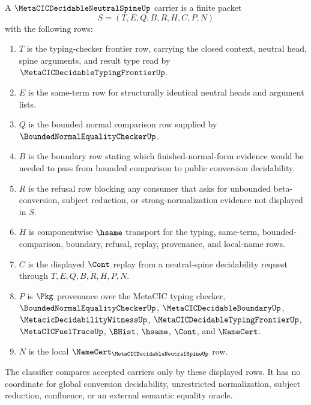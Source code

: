 \begin{definition}
\label{def:metacic-decidable-neutral-spine-carrier}
A $\MetaCICDecidableNeutralSpineUp$ carrier is a finite packet
$$
S=(T,E,Q,B,R,H,C,P,N)
$$
with the following rows:
\begin{enumerate}
\item $T$ is the typing-checker frontier row, carrying the closed context, neutral head, spine arguments, and result type read by $\MetaCICDecidableTypingFrontierUp$.
\item $E$ is the same-term row for structurally identical neutral heads and argument lists.
\item $Q$ is the bounded normal comparison row supplied by $\BoundedNormalEqualityCheckerUp$.
\item $B$ is the boundary row stating which finished-normal-form evidence would be needed to pass from bounded comparison to public conversion decidability.
\item $R$ is the refusal row blocking any consumer that asks for unbounded beta-conversion, subject reduction, or strong-normalization evidence not displayed in $S$.
\item $H$ is componentwise $\hsame$ transport for the typing, same-term, bounded-comparison, boundary, refusal, replay, provenance, and local-name rows.
\item $C$ is the displayed $\Cont$ replay from a neutral-spine decidability request through $T,E,Q,B,R,H,P,N$.
\item $P$ is $\Pkg$ provenance over the MetaCIC typing checker, $\BoundedNormalEqualityCheckerUp$, $\MetaCICDecidableBoundaryUp$, $\MetacicDecidabilityWitnessUp$, $\MetaCICDecidableTypingFrontierUp$, $\MetaCICFuelTraceUp$, $\BHist$, $\hsame$, $\Cont$, and $\NameCert$.
\item $N$ is the local $\NameCert_{\MetaCICDecidableNeutralSpineUp}$ row.
\end{enumerate}
The classifier compares accepted carriers only by these displayed rows. It has no coordinate for global conversion decidability, unrestricted normalization, subject reduction, confluence, or an external semantic equality oracle.
\end{definition}

